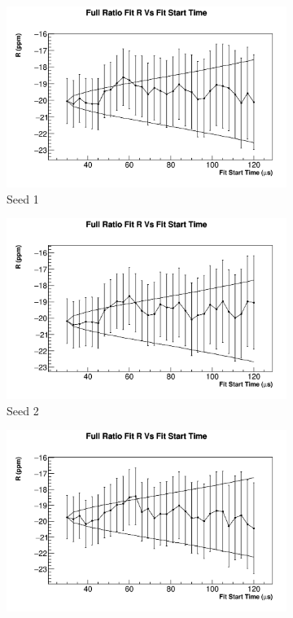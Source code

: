 		\begin{figure}[]
		\centering
		    \begin{subfigure}[t]{0.45\textwidth}
			    \centering
				\includegraphics[width=\textwidth]{RatioCBO_R_FS_canv-Seed0}
			    \caption{Seed 1}
		    \end{subfigure}
		    \begin{subfigure}[t]{0.45\textwidth}
			    \centering
				\includegraphics[width=\textwidth]{RatioCBO_R_FS_canv-Seed5}
			    \caption{Seed 2}
		    \end{subfigure}%
		    \vspace{4mm}
		    \begin{subfigure}[t]{0.45\textwidth}
			    \centering
				\includegraphics[width=\textwidth]{RatioCBO_R_FS_canv-Seed12}

\end{subfigure}
\end{figure}
